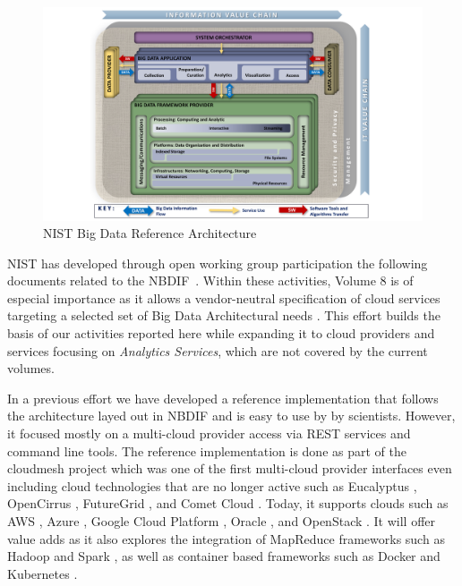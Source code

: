 \begin{figure}[htb]
\centering

\includegraphics[width=1.0\columnwidth]{images/NIST_RA_latest-crop.pdf}

\caption{NIST Big Data Reference Architecture \cite{nist-v8}}

\label{fig:bdra}
\end{figure}

NIST has developed through open working group participation the
following documents related to the
NBDIF~\cite{nist-v1,nist-v2,nist-v3,nist-v4,nist-v5,nist-v6,nist-v7,nist-v8,nist-v9}. Within
these activities, Volume 8 is of especial importance as it allows a
vendor-neutral specification of cloud services targeting a selected
set of Big Data Architectural needs
\cite{cloudmesh-rest,cloudmesh-book}. This effort builds the basis of
our activities reported here while expanding it to cloud providers and
services focusing on {\em Analytics Services}, which are not covered
by the current volumes. 

In a previous effort we have developed a reference implementation that follows the architecture layed out in NBDIF and is easy to use by by scientists. 
However, it focused mostly on a multi-cloud provider access via REST services and command line tools. The reference implementation is done as part of the cloudmesh project which was one of the first multi-cloud provider interfaces even including cloud technologies that are no longer active such as Eucalyptus \cite{??}, OpenCirrus \cite{??}, FutureGrid \cite{??}, and Comet Cloud \cite{??}. Today, it supports clouds such as AWS \cite{www-aws}, Azure \cite{www-azure}, Google Cloud Platform \cite{??}, Oracle \cite{??}, and OpenStack \cite{www-openStack}. It will offer value adds as it also explores the integration of MapReduce frameworks such as Hadoop \cite{??} and Spark \cite{??}, as well as container based frameworks such as Docker \cite{??} and Kubernetes \cite{??}. 

